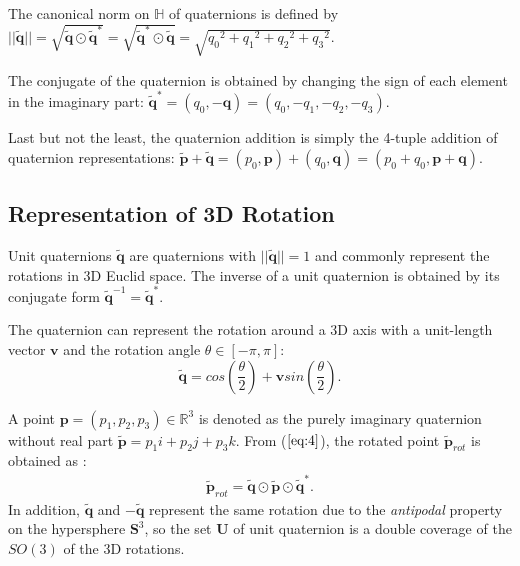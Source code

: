 \documentclass[micromachines,article,accept,pdftex,moreauthors]{Definitions/mdpi}
\begin{document}
The canonical norm on $\mathbb {H}$ of quaternions is defined by $||\widetilde{\boldsymbol{q}}|| = \sqrt{\widetilde{\boldsymbol{q}} \odot \widetilde{\boldsymbol{q}}^{*}} = \sqrt{\widetilde{\boldsymbol{q}}^{*}
    \odot \widetilde{\boldsymbol{q}}} = 
    \sqrt{{q_0}^2 + {q_1}^2 + {q_2}^2 + {q_3}^2}.$

The conjugate of the quaternion is obtained by changing the sign of each element in the imaginary part: $\widetilde{\boldsymbol{q}}^{*} = (q_0, - \boldsymbol{q}) = (q_0, -q_1, -q_2, -q_3)$.

Last but not the least, the quaternion addition is simply the 4-tuple addition of quaternion representations:
$\widetilde{\boldsymbol{p}} + \widetilde{\boldsymbol{q}} = (p_0, \boldsymbol{p}) + (q_0, \boldsymbol{q}) = (p_0 + q_0, \boldsymbol{p} + \boldsymbol{q})$.


\subsection{Representation of 3D Rotation} \label{2.2}

Unit quaternions $\widetilde{\boldsymbol{q}}$ are quaternions with $||\widetilde{\boldsymbol{q}}|| = 1$ and commonly represent the rotations in 3D Euclid space.
The inverse of a unit quaternion is obtained by its conjugate form $\widetilde{\boldsymbol{q}}^{-1} = \widetilde{\boldsymbol{q}}^{*}$.

{The quaternion can represent the rotation around a 3D axis with a unit-length vector} $\boldsymbol{v}$ and the rotation angle $\theta \in [-\pi, \pi]$: %
\begin{equation} \label{eq:4}
\widetilde{\boldsymbol{q}} = cos({\frac{\theta}{2}}) + \boldsymbol{v}sin({\frac{\theta}{2}}).
\end{equation}

A point $\boldsymbol{p} = (p_1, p_2, p_3) \in \mathbb{R}^3$ is denoted as the purely imaginary quaternion without real part $\widetilde{\boldsymbol{p}} = {p_1}i + {p_2}j + {p_3}k$. From ($\ref{eq:4}$), the rotated point $\widetilde{\boldsymbol{p}}_{rot}$ is obtained as \cite{feiten20096d}: 
\begin{align*}
    \widetilde{\boldsymbol{p}}_{rot} = \widetilde{\boldsymbol{q}} \odot \widetilde{\boldsymbol{p}} \odot
    \widetilde{\boldsymbol{q}}^{*}.
\end{align*}
In addition, $\widetilde{\boldsymbol{q}}$ and $-\widetilde{\boldsymbol{q}}$ represent the same rotation due to the \textit{antipodal} property on the hypersphere $\boldsymbol{S}^3$, so the set $\boldsymbol{U}$ of unit quaternion is a double coverage of the $SO(3)$ of the 3D rotations.
\end{document}
